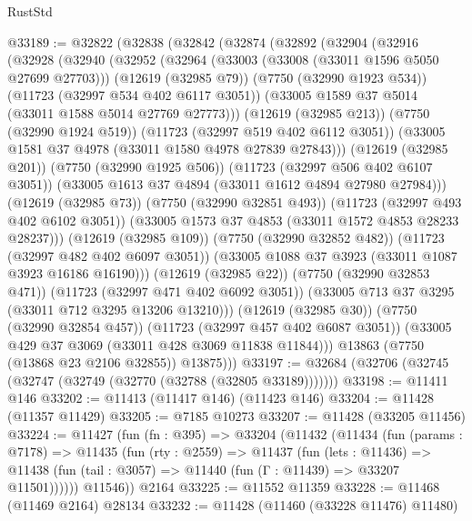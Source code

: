 \begin{lexlean}{RustStd}
\begin{coremodule}
@33189 := @32822
    (@32838
      (@32842
        (@32874
          (@32892
            (@32904
              (@32916
                (@32928
                  (@32940
                    (@32952
                      (@32964
                        (@33003 (@33008 (@33011 @1596 @5050 @27699 @27703)))
                        (@12619 (@32985 @79))
                        (@7750 (@32990 @1923 @534))
                        (@11723 (@32997 @534 @402 @6117 @3051))
                        (@33005 @1589 @37 @5014 (@33011 @1588 @5014 @27769 @27773)))
                      (@12619 (@32985 @213))
                      (@7750 (@32990 @1924 @519))
                      (@11723 (@32997 @519 @402 @6112 @3051))
                      (@33005 @1581 @37 @4978 (@33011 @1580 @4978 @27839 @27843)))
                    (@12619 (@32985 @201))
                    (@7750 (@32990 @1925 @506))
                    (@11723 (@32997 @506 @402 @6107 @3051))
                    (@33005 @1613 @37 @4894 (@33011 @1612 @4894 @27980 @27984)))
                  (@12619 (@32985 @73))
                  (@7750 (@32990 @32851 @493))
                  (@11723 (@32997 @493 @402 @6102 @3051))
                  (@33005 @1573 @37 @4853 (@33011 @1572 @4853 @28233 @28237)))
                (@12619 (@32985 @109))
                (@7750 (@32990 @32852 @482))
                (@11723 (@32997 @482 @402 @6097 @3051))
                (@33005 @1088 @37 @3923 (@33011 @1087 @3923 @16186 @16190)))
              (@12619 (@32985 @22))
              (@7750 (@32990 @32853 @471))
              (@11723 (@32997 @471 @402 @6092 @3051))
              (@33005 @713 @37 @3295 (@33011 @712 @3295 @13206 @13210)))
            (@12619 (@32985 @30))
            (@7750 (@32990 @32854 @457))
            (@11723 (@32997 @457 @402 @6087 @3051))
            (@33005 @429 @37 @3069 (@33011 @428 @3069 @11838 @11844)))
          @13863
          (@7750 (@13868 @23 @2106 @32855))
          @13875)))
@33197 := @32684 (@32706 (@32745 (@32747 (@32749 (@32770 (@32788 (@32805 @33189)))))))
@33198 := @11411 @146
@33202 := @11413 (@11417 @146) (@11423 @146)
@33204 := @11428 (@11357 @11429)
@33205 := @7185 @10273
@33207 := @11428 (@33205 @11456)
@33224 := @11427
    (fun (fn : @395) =>
    @33204
      (@11432
        (@11434
          (fun (params : @7178) =>
          @11435
            (fun (rty : @2559) =>
            @11437
              (fun (lets : @11436) =>
              @11438 (fun (tail : @3057) => @11440 (fun (Γ : @11439) => @33207 @11501))))))
        @11546))
    @2164
@33225 := @11552 @11359
@33228 := @11468 (@11469 @2164) @28134
@33232 := @11428 (@11460 (@33228 @11476) @11480)

\end{coremodule}
\end{lexlean}
